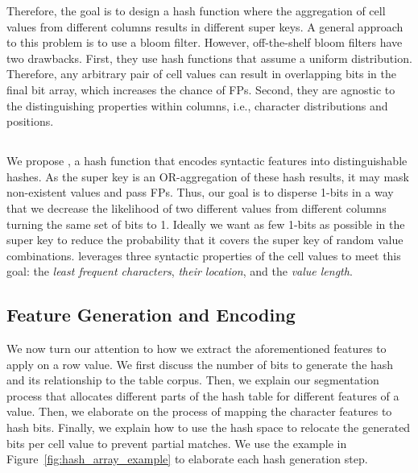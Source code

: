 Therefore, the goal is to design a hash function where the aggregation of cell values from different columns results in different super keys.
A general approach to this problem is to use a bloom filter.
However, off-the-shelf bloom filters have two drawbacks.
First, they use hash functions that assume a uniform distribution.
Therefore, any arbitrary pair of cell values can result in overlapping bits in the final bit array, which increases the chance of FPs.
Second, they are agnostic to the distinguishing properties within columns, i.e., character distributions and positions.


\subsection{\hash}\label{subsec:synhash}
We propose \hash, a hash function that encodes syntactic features into distinguishable hashes.
As the super key is an OR-aggregation of these hash results, it may mask non-existent values and pass FPs. 
Thus, our goal is to disperse 1-bits in a way that we decrease the likelihood of two different values from different columns turning the same set of bits to 1. Ideally we want as few 1-bits as possible in the super key to reduce the probability that it covers the super key of random value combinations.
\hash leverages three syntactic properties of the cell values to meet this goal:
the {\em least frequent characters}, {\em their location}, and the {\em value length}.

\subsection{Feature Generation and Encoding} \label{subsec:hash_generation_process}
We now turn our attention to how we extract the aforementioned features to apply \hash on a row value.
We first discuss the number of bits to generate the hash and its relationship to the table corpus.
Then, we explain our segmentation process that allocates different parts of the hash table for different features of a value.
Then, we elaborate on the process of mapping the character features to hash bits.
Finally, we explain how to use the hash space to relocate the generated bits per cell value to prevent partial matches.
We use the example in Figure~\ref{fig:hash_array_example} to elaborate each hash generation step.

